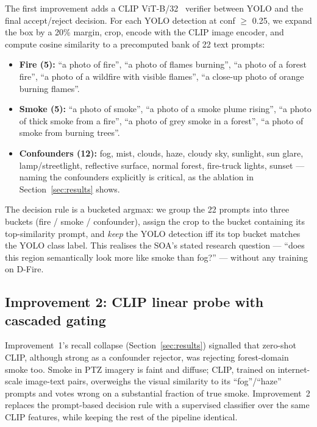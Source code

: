 \documentclass{article}
\begin{document}
The first improvement adds a CLIP ViT-B/32~\cite{clip} verifier between YOLO
and the final accept/reject decision. For each YOLO detection at conf $\geq$ 0.25,
we expand the box by a 20\% margin, crop, encode with the CLIP image encoder,
and compute cosine similarity to a precomputed bank of 22 text prompts:

\begin{itemize}\itemsep1pt
\item \textbf{Fire (5):} ``a photo of fire'', ``a photo of flames burning'',
      ``a photo of a forest fire'', ``a photo of a wildfire with visible
      flames'', ``a close-up photo of orange burning flames''.
\item \textbf{Smoke (5):} ``a photo of smoke'', ``a photo of a smoke plume
      rising'', ``a photo of thick smoke from a fire'', ``a photo of grey smoke
      in a forest'', ``a photo of smoke from burning trees''.
\item \textbf{Confounders (12):} fog, mist, clouds, haze, cloudy sky, sunlight,
      sun glare, lamp/streetlight, reflective surface, normal forest, fire-truck
      lights, sunset --- naming the confounders explicitly is critical, as the
      ablation in Section~\ref{sec:results} shows.
\end{itemize}

The decision rule is a bucketed argmax: we group the 22 prompts into three
buckets (fire / smoke / confounder), assign the crop to the bucket containing
its top-similarity prompt, and \emph{keep} the YOLO detection iff its top
bucket matches the YOLO class label. This realises the SOA's stated research
question --- ``does this region semantically look more like smoke than fog?'' ---
without any training on D-Fire.

\subsection{Improvement 2: CLIP linear probe with cascaded gating}
\label{sec:i2}

Improvement~1's recall collapse (Section~\ref{sec:results}) signalled that
zero-shot CLIP, although strong as a confounder rejector, was rejecting
forest-domain smoke too. Smoke in PTZ imagery is faint and diffuse; CLIP, trained
on internet-scale image-text pairs, overweighs the visual similarity to its
``fog''/``haze'' prompts and votes wrong on a substantial fraction of true
smoke. Improvement~2 replaces the prompt-based decision rule with a
supervised classifier over the same CLIP features, while keeping the rest of
the pipeline identical.
\end{document}
